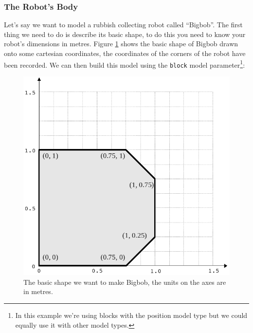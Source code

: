 \documentclass[a4paper]{report}
\begin{document}
\subsubsection{The Robot's Body}\label{sec:BuildingAWorld:BuildingRobot:ExampleRobot:Body}
Let's say we want to model a rubbish collecting robot called ``Bigbob''. The first thing we need to do is describe its basic shape, to do this you need to know your robot's dimensions in metres. Figure \ref{fig:BuildingAWorld:BuildingRobot:ExampleRobot:Body:BasicBigbob} shows the basic shape of Bigbob drawn onto some cartesian coordinates, the coordinates of the corners of the robot have been recorded. We can then build this model using the \verb|block| model parameter\footnote{In this example we're using blocks with the position model type but we could equally use it with other model types.}:
\begin{figure}
	\centering
	\includegraphics[width=0.7\linewidth]{./pics/robot_building/bigbob1.png} 
	\caption{The basic shape we want to make Bigbob, the units on the axes are in metres.}
	\label{fig:BuildingAWorld:BuildingRobot:ExampleRobot:Body:BasicBigbob}
\end{figure}
\end{document}
